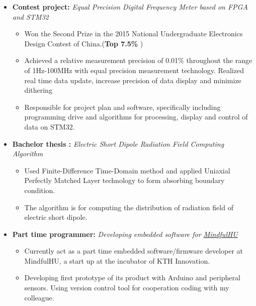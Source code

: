 \documentclass[12pt,a4paper,sans]{moderncv}        %
\begin{document}
\begin{itemize}



\item{
\textbf{Contest project:} \textit{Equal Precision Digital Frequency Meter based on FPGA and STM32}

\vspace{3pt}
\begin{itemize}
\item{\small{Won the Second Prize in the 2015 National Undergraduate Electronics Design Contest of China.(\textbf{Top 7.5\% })}}

\item{\small{Achieved a relative measurement precision of 0.01\% throughout the range of 1Hz-100MHz with equal precision measurement technology. Realized real time data update, increase precision of data display and minimize dithering}}
\item{\small{Responsible for project plan and software, specifically including programming drive and algorithms for processing, display and control of data on STM32.}}
 
\end{itemize}
}

\vspace{6pt}

\item{
\textbf{Bachelor thesis :} \textit{Electric Short Dipole Radiation Field Computing Algorithm }


\begin{itemize}
\item{\small{Used Finite-Difference Time-Domain method and applied Uniaxial Perfectly Matched Layer technology to form absorbing boundary condition.}}
\item{\small{The algorithm is for computing the distribution of radiation field of electric short dipole.}}
\end{itemize}
}

\vspace{6pt}

\item{
\textbf{Part time programmer: }\textit{Developing embedded software for \href{https://www.mindfulhu.com/}{MindfulHU}}


\begin{itemize}
\item{\small{Currently act as a part time embedded software/firmware developer at MindfulHU, a start up at the incubator of KTH Innovation.}}
\item{\small{Developing first prototype of its product with Arduino and peripheral sensors. Using version control tool for cooperation coding with my colleague.}}
\end{itemize}
}

\end{itemize}
\end{document}
